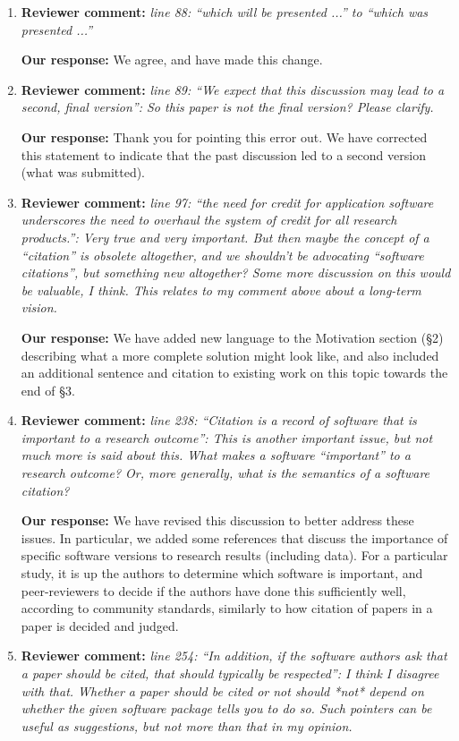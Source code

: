 \documentclass{article}
\begin{document}
\begin{enumerate}
\item \textbf{Reviewer comment:}
\emph{line 88: ``which will be presented ...'' to ``which was presented ...''}

\textbf{Our response:}
We agree, and have made this change.


\item \textbf{Reviewer comment:}
\emph{line 89: ``We expect that this discussion may lead to a second, final version'': So this paper is not the final version? Please clarify.}

\textbf{Our response:}
Thank you for pointing this error out. We have corrected this statement to indicate that the past discussion led to a second version (what was submitted).


\item \textbf{Reviewer comment:}
\emph{line 97: ``the need for credit for application software underscores the need to overhaul the system of credit for all research products.'': Very true and very important. But then maybe the concept of a ``citation'' is obsolete altogether, and we shouldn't be advocating ``software citations'', but something new altogether? Some more discussion on this would be valuable, I think. This relates to my comment above about a long-term vision.}

\textbf{Our response:}
We have added new language to the Motivation section (\S 2) describing what a
more complete solution might look like, and also included an additional sentence
and citation to existing work on this topic towards the end of \S 3.


\item \textbf{Reviewer comment:}
\emph{line 238: ``Citation is a record of software that is important to a research outcome'': This is another important issue, but not much more is said about this. What makes a software ``important'' to a research outcome? Or, more generally, what is the semantics of a software citation?}

\textbf{Our response:}
We have revised this discussion to better address these issues. In particular, we
added some references that discuss the importance of specific software versions to
research results (including data). For a particular study, it is up the authors to
determine which software is important, and peer-reviewers to decide if the authors have
done this sufficiently well, according to community standards, similarly to how citation
of papers in a paper is decided and judged.

\item \textbf{Reviewer comment:}
\emph{line 254: ``In addition, if the software authors ask that a paper should be cited, that should typically be respected'': I think I disagree with that. Whether a paper should be cited or not should *not* depend on whether the given software package tells you to do so. Such pointers can be useful as suggestions, but not more than that in my opinion.}


\end{enumerate}
\end{document}
